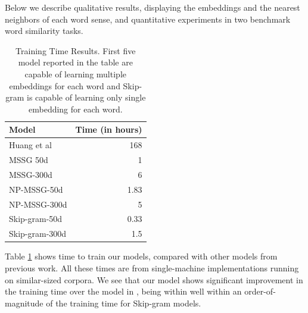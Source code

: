 \documentclass[11pt,a4paper]{article}
\begin{document}
Below we describe qualitative results, displaying the embeddings and
the nearest neighbors of each word sense, and quantitative experiments
in two benchmark word similarity tasks.

\begin{table}
\centering
\begin{tabular}{|l|r|}
\hline 
Model & Time (in hours) \\ \hline \hline
Huang et al & 168 \\ \hline
MSSG 50d  & 1  \\ \hline
MSSG-300d & 6 \\ \hline
NP-MSSG-50d & 1.83  \\ \hline
NP-MSSG-300d &  5 \\ \hline \hline
Skip-gram-50d &  0.33\\ \hline
Skip-gram-300d &  1.5  \\ \hline
\end{tabular}
\caption{Training Time Results. First five model reported in the table are capable of learning multiple embeddings for each word and Skip-gram  is capable of learning only single embedding for each word.}
\label{table:training-time-exp}
\end{table}

Table \ref{table:training-time-exp} shows time to train our models,
compared with other models from previous work. All these times are
from single-machine implementations running on similar-sized
corpora. We see that our model shows significant improvement in the
training time over the model in , being within
well within an order-of-magnitude of the training time for Skip-gram models.
\end{document}
